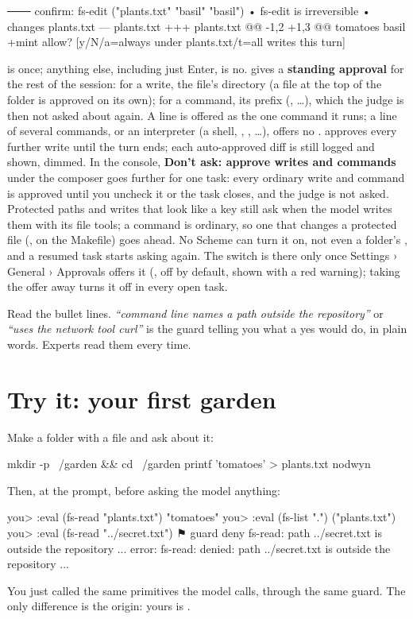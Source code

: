 \begin{txt}
─── confirm: fs-edit ("plants.txt" "basil" "basil\nmint")
  • fs-edit is irreversible
  • changes plants.txt
  --- plants.txt
  +++ plants.txt
  @@ -1,2 +1,3 @@
   tomatoes
   basil
  +mint
allow? [y/N/a=always under plants.txt/t=all writes this turn]
\end{txt}

 is once; anything else, including just Enter, is no. 
gives a \textbf{standing approval} for the rest of the session: for a write,
the file's directory (a file at the top of the folder is approved on its
own); for a command, its prefix (, \ldots), which
the judge is then not asked about again. A  line is offered as
the one command it runs; a line of several commands, or an interpreter
(a shell, , , \ldots), offers no .  approves every further
write until the turn ends; each auto-approved diff is still logged and
shown, dimmed.
In the console, \textbf{Don't ask: approve writes and commands} under the
composer goes further for one task: every ordinary write and command is
approved until you uncheck it or the task closes, and the judge is not
asked. Protected paths and writes that look like a key still ask when the
model writes them with its file tools; a command is ordinary, so one that
changes a protected file (,  on
the Makefile) goes ahead. No Scheme
can turn it on, not even a folder's , and a resumed task
starts asking again. The switch is there only once Settings › General › Approvals
offers it (, off by default, shown with a
red warning); taking the offer away turns it off in every open task.

\begin{tip}
Read the bullet lines. \emph{``command line names a path outside the
repository''} or \emph{``uses the network tool curl''} is the guard telling
you what a yes would do, in plain words. Experts read them every time.
\end{tip}

\section{Try it: your first garden}

\begin{tryit}
Make a folder with a file and ask about it:
\begin{sh}
mkdir -p ~/garden && cd ~/garden
printf 'tomatoes\nbasil\n' > plants.txt
nodwyn
\end{sh}
Then, at the prompt, before asking the model anything:
\begin{txt}
you> :eval (fs-read "plants.txt")
"tomatoes\nbasil\n"
you> :eval (fs-list ".")
("plants.txt")
you> :eval (fs-read "../secret.txt")
⚑ guard deny fs-read: path ../secret.txt is outside the repository ...
error: fs-read: denied: path ../secret.txt is outside the repository ...
\end{txt}
You just called the same primitives the model calls, through the same
guard. The only difference is the origin: yours is .
\end{tryit}

